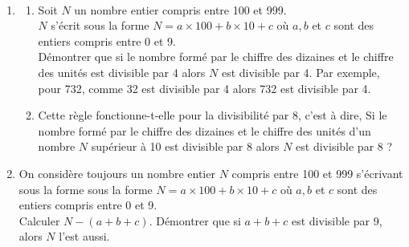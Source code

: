 \begin{exercice}[CRPE 2020 G5] %
\ \\ [-10mm]
   \begin{enumerate}
      \item
         \begin{enumerate}
            \item Soit $N$ un nombre entier compris entre 100 et 999. \\
               $N$ s’écrit sous la forme $N =a\times100+b\times10+c$ où $a, b$ et $c$ sont des entiers compris entre 0 et 9. \\
               Démontrer que si le nombre formé par le chiffre des dizaines et le chiffre des unités est divisible par 4 alors $N$ est divisible par 4. Par exemple, pour 732, comme 32 est divisible par 4 alors 732 est divisible par 4.
            \item Cette règle fonctionne-t-elle pour la divisibilité par 8, c’est à dire, \og Si le nombre formé par le chiffre des dizaines et le chiffre des unités d’un nombre $N$ supérieur à 10 est divisible par 8 alors $N$ est divisible par 8 \fg ?
         \end{enumerate}
      \item On considère toujours un nombre entier $N$ compris entre 100 et 999 s’écrivant sous la forme sous la forme $N =a\times100+b\times10+c$ où $a, b$ et $c$ sont des entiers compris entre 0 et 9. \\
         Calculer $N-(a+b+c)$. Démontrer que si $a+b+c$ est divisible par 9, alors $N$ l’est aussi.
   \end{enumerate}
\end{exercice}
   
